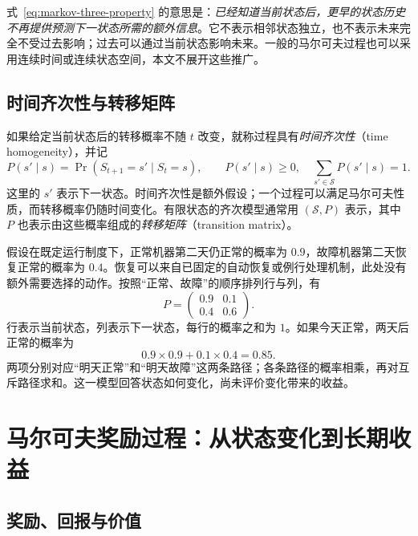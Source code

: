 \documentclass[UTF8,12pt,a4paper,fontset=fandol]{ctexart}
\begin{document}
式~\eqref{eq:markov-three-property} 的意思是：\emph{已经知道当前状态后，更早的状态历史不再提供预测下一状态所需的额外信息}。它不表示相邻状态独立，也不表示未来完全不受过去影响；过去可以通过当前状态影响未来。一般的马尔可夫过程也可以采用连续时间或连续状态空间，本文不展开这些推广。

\subsection{时间齐次性与转移矩阵}

如果给定当前状态后的转移概率不随 $t$ 改变，就称过程具有\emph{时间齐次性}（time homogeneity），并记
\begin{equation}
  P(s'\mid s)=\Pr(S_{t+1}=s'\mid S_t=s),
  \qquad
  P(s'\mid s)\geq0,\quad
  \sum_{s'\in\mathcal S}P(s'\mid s)=1.
  \label{eq:markov-three-transition}
\end{equation}
这里的 $s'$ 表示下一状态。时间齐次性是额外假设；一个过程可以满足马尔可夫性质，而转移概率仍随时间变化。有限状态的齐次模型通常用 $(\mathcal S,P)$ 表示，其中 $P$ 也表示由这些概率组成的\emph{转移矩阵}（transition matrix）。

\begin{example}[机器状态的随机演化]
\label{ex:markov-three-machine}
假设在既定运行制度下，正常机器第二天仍正常的概率为 $0.9$，故障机器第二天恢复正常的概率为 $0.4$。恢复可以来自已固定的自动恢复或例行处理机制，此处没有额外需要选择的动作。按照“正常、故障”的顺序排列行与列，有
\begin{equation}
  P=\begin{pmatrix}
    0.9&0.1\\
    0.4&0.6
  \end{pmatrix}.
  \label{eq:markov-three-machine-p}
\end{equation}
行表示当前状态，列表示下一状态，每行的概率之和为 $1$。如果今天正常，两天后正常的概率为
\[
  0.9\times0.9+0.1\times0.4=0.85.
\]
两项分别对应“明天正常”和“明天故障”这两条路径；各条路径的概率相乘，再对互斥路径求和。这一模型回答状态如何变化，尚未评价变化带来的收益。
\end{example}

\section{马尔可夫奖励过程：从状态变化到长期收益}
\label{sec:markov-three-mrp}

\subsection{奖励、回报与价值}
\end{document}
